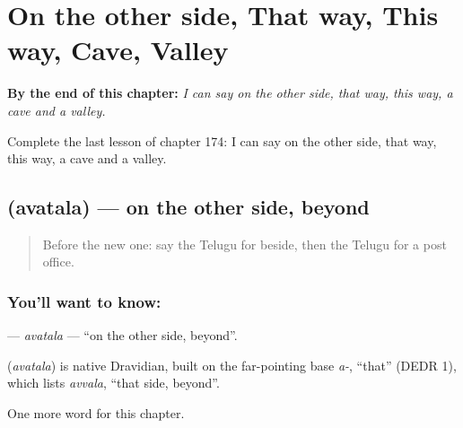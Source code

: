 
\chapter{On the other side, That way, This way, Cave, Valley}
\label{ch:te-on-the-other-side-that-way-this-way-cave-valley}

\begin{chapteropening}
\textbf{By the end of this chapter:} \emph{I can say on the other side, that way, this way, a cave and a valley.}

Complete the last lesson of chapter 174: I can say on the other side, that way, this way, a cave and a valley.
\end{chapteropening}

\section[\texorpdfstring{\te{అవతల} (avatala)}{అవతల (avatala)}]{ (avatala) — on the other side, beyond}

\label{lesson:TE-C174-avatala}



\begin{quote}
Before the new one: say the Telugu for beside, then the Telugu for a post office.
\end{quote}

\subsection*{You'll want to know: }
\textbf{} — \emph{avatala} — \textquotedblleft{}on the other side, beyond\textquotedblright{}.

\begin{cousinweb}
\textbf{} (\emph{avatala}) is native Dravidian, built on the far-pointing base \emph{a-}, \textquotedblleft{}that\textquotedblright{} (DEDR 1), which lists \emph{avvala}, \textquotedblleft{}that side, beyond\textquotedblright{}.
\end{cousinweb}

\begin{grammarlens}[title={What you've built}]
One more word for this chapter.
\end{grammarlens}

